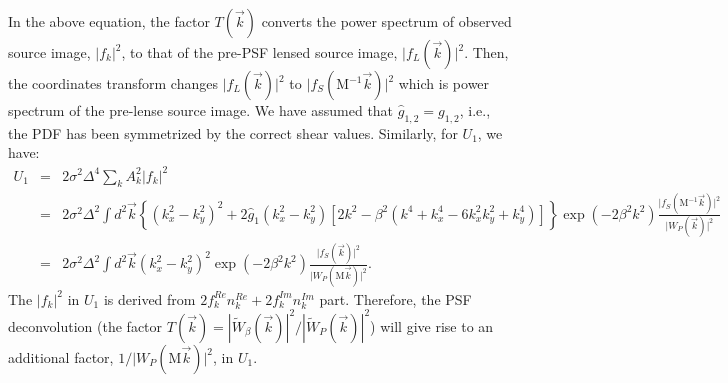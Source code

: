 \documentclass[twocolumn]{aastex62}
\begin{document}
In the above equation, the factor $T(\vec{k})$ converts the power spectrum of observed source image, $\vert f_k\vert^2$, to that of the pre-PSF lensed source image, $\vert f_L(\vec{k})\vert^2$. Then, the coordinates transform changes $\vert f_L(\vec{k})\vert^2$ to $\vert f_S(\mathrm{M}^{-1}\vec{k})\vert^2$ which is power spectrum of the pre-lense source image. We have assumed that $\hat{g}_{1,2}=g_{1,2}$, i.e., the PDF has been symmetrized by the correct shear values. Similarly, for $U_1$, we have:
\begin{eqnarray}
U_1&=&2\sigma^2\Delta^4\sum_kA_k^2\vert f_k\vert^2\\ \nonumber
&=&2\sigma^2\Delta^2\int{d}^2\vec{k}\left\{\left(k_x^2-k_y^2\right)^2+2\hat{g}_1\left(k_x^2-k_y^2\right)\left[2k^2-\beta^2\left(k^4+k_x^4-6k_x^2k_y^2+k_y^4\right)\right]\right\}\exp(-2\beta^2k^2)\frac{\vert f_S(\mathrm{M}^{-1}\vec{k})\vert^2}{\vert W_{P}(\vec{k})\vert^2}\\ \nonumber
&=&2\sigma^2\Delta^2\int{d}^2\vec{k}\left(k_x^2-k_y^2\right)^2\exp(-2\beta^2k^2)\frac{\vert f_S(\vec{k})\vert^2}{\vert W_{P}(\mathrm{M}\vec{k})\vert^2}.
\end{eqnarray}
The $\vert f_k\vert^2$ in $U_1$ is derived from $2f_k^{Re}n_k^{Re}+2f_k^{Im}n_k^{Im}$ part. Therefore, the PSF deconvolution (the factor $T(\vec{k}) = |\widetilde{W}_{\beta}(\vec{k})|^2/|\widetilde{W}_{P}(\vec{k})|^2$) will give rise to an additional factor, $1/\vert W_{P}(\mathrm{M}\vec{k})\vert^2$, in $U_1$.
\end{document}
